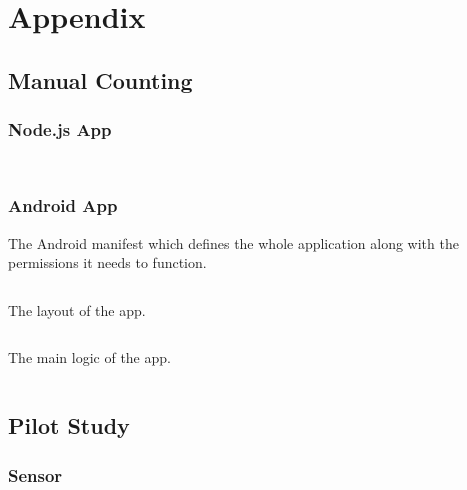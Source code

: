 \chapter{Appendix}

\cleardoublepage

\section{Manual Counting}

\subsection{Node.js App} \label{appendix:manualcount}
\vspace{1em}
\inputminted{javascript}{tools/manual-count/package.json}
\inputminted{javascript}{tools/manual-count/manualcount.js}

\subsection{Android App} \label{appendix:clicker}
\vspace{1em}
The Android manifest which defines the whole application along with the permissions it needs to function.
\inputminted{xml}{tools/clicker/manifest.xml}
\vspace{1em}
The layout of the app.
\inputminted{xml}{tools/clicker/layout.xml}
\vspace{1em}
The main logic of the app.
\inputminted{java}{tools/clicker/activity.java}
\pagebreak

\section{Pilot Study}

\subsection{Sensor} \label{appendix:pilot:sensor}
\vspace{1em}
\inputminted{javascript}{tools/pilot/sensor-package.json}
\inputminted{javascript}{tools/pilot/sensor-collect.js}
\inputminted{bash}{tools/pilot/sensor-collect.sh}


